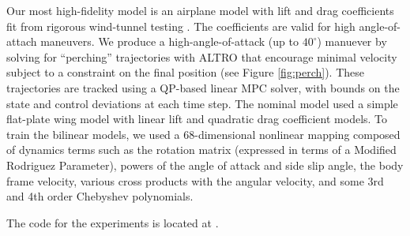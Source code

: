 \documentclass{article}
\begin{document}
Our most high-fidelity model is an airplane model with lift and drag coefficients fit from
rigorous wind-tunnel testing \cite{Manchester2017}. The coefficients are valid for high
angle-of-attach maneuvers. We produce a high-angle-of-attack (up to $40^\circ$) manuever by
solving for ``perching'' trajectories with ALTRO that encourage minimal velocity subject to
a constraint on the final position (see Figure \ref{fig:perch}). These trajectories are
tracked using a QP-based linear MPC solver, with bounds on the state and control deviations
at each time step. The nominal model used a simple flat-plate wing model with linear lift
and quadratic drag coefficient models. To train the bilinear models, we used a
68-dimensional nonlinear mapping composed of dynamics terms such as the rotation matrix
(expressed in terms of a Modified Rodriguez Parameter), powers of the angle of attack and
side slip angle, the body frame velocity, various cross products with the angular velocity,
and some 3rd and 4th order Chebyshev polynomials.


The code for the experiments is located at .  


\end{document}
